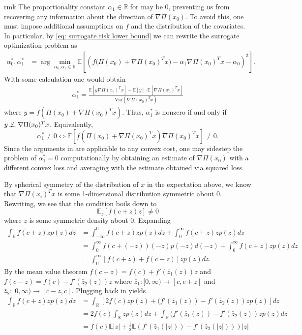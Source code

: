 \documentclass[11pt]{article}
\begin{document}
\begin{restatable}{rmk}{}
    The proportionality constant $\alpha_1 \in \mathbb{R}$ for  may be $0$, preventing us from recovering any information about the direction of $\nabla\Pi(x_0)$. To avoid this, one must impose additional assumptions on $f$ and the distribution of the covariates. In particular, by \cref{eq: surrogate risk lower bound} we can rewrite the surrogate optimization problem as
    \begin{align}
        \alpha_0^*, \alpha_1^* &= \arg\min_{\alpha_0, \alpha_1 \in \mathbb{R}} \mathbb{E}\left[\left(f\Big(\Pi(x_0) + \nabla\Pi(x_0)^{T}x\Big) - \alpha_1 \nabla\Pi(x_0)^Tx - \alpha_0 \right)^2\right].
    \end{align}
    With some calculation one would obtain
    \begin{align}
        \alpha_1^* = \frac{\mathbb{E}\left[y\nabla\Pi(x_0)^Tx\right] - \mathbb{E}[y]\cdot \mathbb{E}\left[\nabla\Pi(x_0)^Tx\right]}{\text{Var}(\nabla\Pi(x_0)^Tx)}
    \end{align}
    where $y = f\left(\Pi(x_0) + \nabla\Pi(x_0)^Tx\right)$. Thus, $
    \alpha_1^*$ is nonzero if and only if $y \not\!\perp\!\!\!\perp \nabla\Pi(x_0)^Tx$. Equivalently, 
    \[\alpha_1^* \neq 0 \iff \mathbb{E}\left[f\left(\Pi(x_0) + \nabla\Pi(x_0)^Tx\right)\nabla\Pi(x_0)^Tx\right] \neq 0.\]
    Since the arguments in  are applicable to any convex cost, one may sidestep the problem of $\alpha^*_1 = 0$ computationally by obtaining an estimate of $\nabla\Pi(x_0)$ with a different convex loss and averaging with the estimate obtained via squared loss.
    
    
\end{restatable}

By spherical symmetry of the distribution of $x$ in the expectation above, we know that $\nabla\Pi(x_i)^Tx$ is some 1-dimensional distribution symmetric about $0$. Rewriting, we see that the condition boils down to 
\[\mathbb{E}_z[f(c + z)z] \neq 0\]
where $z$ is some symmetric density about $0$. Expanding
\begin{align*}
    \int_{\mathbb{R}}f(c+z)z p(z)dz &= \int_{-\infty}^0 f(c+z)z p(z)dz + \int_{0}^\infty f(c+z)z p(z)dz \\
    &= \int_{0}^\infty f(c+(-z))(-z) p(-z)d(-z) + \int_{0}^\infty f(c+z)z p(z)dz\\
    &= \int_{0}^{\infty}[f(c + z) + f(c - z)]zp(z)dz.
\end{align*}
By the mean value theorem $f(c + z) = f(c) + f'(\bar{z}_1(z))z$ and $f(c - z) = f(c) - f'(\bar{z}_2(z))z$ where $\bar{z}_1: [0, \infty) \rightarrow  [c, c+z]$ and $\bar{z}_2: [0, \infty) \rightarrow [c-z, c]$. Plugging back in yields
\begin{align*}
    \int_{\mathbb{R}}f(c+z)z p(z)dz &= \int_\mathbb{R}\left[2f(c)zp(z) + (f'(\bar{z}_1(z)) - f'(\bar{z}_2(z))zp(z)\right]dz \\
    &= 2f(c)\int_\mathbb{R}zp(z)dz + \int_\mathbb{R}(f'(\bar{z}_1(z)) - f'(\bar{z}_2(z))zp(z)dz \\
    &= f(c) \mathbb{E}|z| + \frac{1}{2}\mathbb{E}\left(f'(\bar{z}_1(|z|)) - f'(\bar{z}_2(|z|))\right)|z|
\end{align*}
\end{document}

